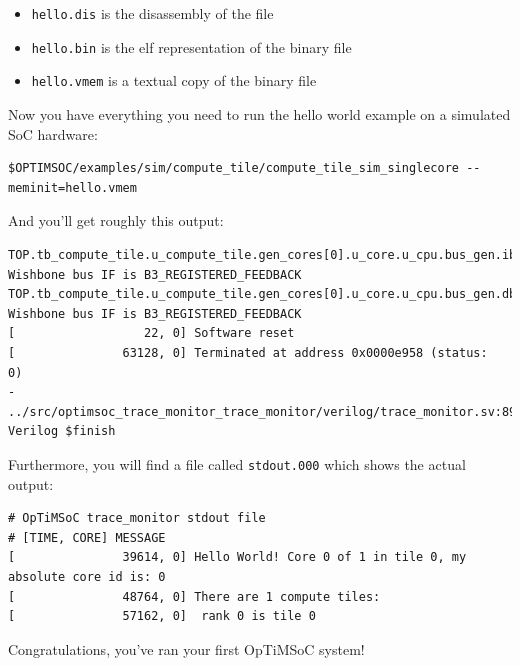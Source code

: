 \begin{itemize}
\item \verb|hello.dis| is the disassembly of the file
\item \verb|hello.bin| is the elf representation of the binary file
\item \verb|hello.vmem| is a textual copy of the binary file
\end{itemize}

Now you have everything you need to run the hello world example on a simulated SoC hardware:

\begin{lstlisting}
$OPTIMSOC/examples/sim/compute_tile/compute_tile_sim_singlecore --meminit=hello.vmem
\end{lstlisting}

And you'll get roughly this output:

\begin{lstlisting}
TOP.tb_compute_tile.u_compute_tile.gen_cores[0].u_core.u_cpu.bus_gen.ibus_bridge: Wishbone bus IF is B3_REGISTERED_FEEDBACK
TOP.tb_compute_tile.u_compute_tile.gen_cores[0].u_core.u_cpu.bus_gen.dbus_bridge: Wishbone bus IF is B3_REGISTERED_FEEDBACK
[                  22, 0] Software reset
[               63128, 0] Terminated at address 0x0000e958 (status:          0)
- ../src/optimsoc_trace_monitor_trace_monitor/verilog/trace_monitor.sv:89: Verilog $finish
\end{lstlisting}

Furthermore, you will find a file called \verb|stdout.000| which shows the actual output:

\begin{lstlisting}
# OpTiMSoC trace_monitor stdout file
# [TIME, CORE] MESSAGE
[               39614, 0] Hello World! Core 0 of 1 in tile 0, my absolute core id is: 0
[               48764, 0] There are 1 compute tiles:
[               57162, 0]  rank 0 is tile 0
\end{lstlisting}

Congratulations, you've ran your first OpTiMSoC system!


